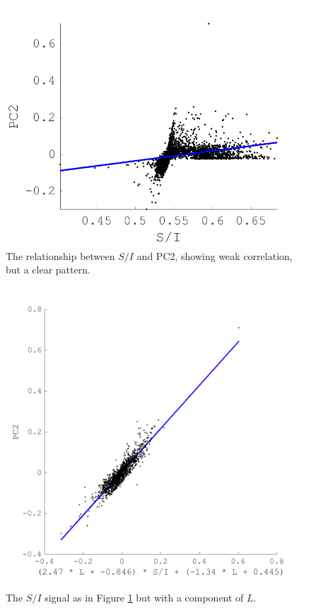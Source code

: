 \begin{figure}[htbp]
 \includegraphics[max width=\textwidth]{figs/comp/melcomp_3/21.png}
 \caption{The relationship between $S/I$ and \gls{PC2}, showing weak correlation, but a clear pattern.}
 \label{fig:S/I-PC2}
\end{figure} 

\begin{figure}[htbp]
 \includegraphics[max width=\textwidth]{figs/comp/melcomp_3/24.png}
 \caption{The $S/I$ signal as in Figure \ref{fig:S/I-PC2} but with a component of $L$.}
 \label{fig:withPC1}
\end{figure} 

